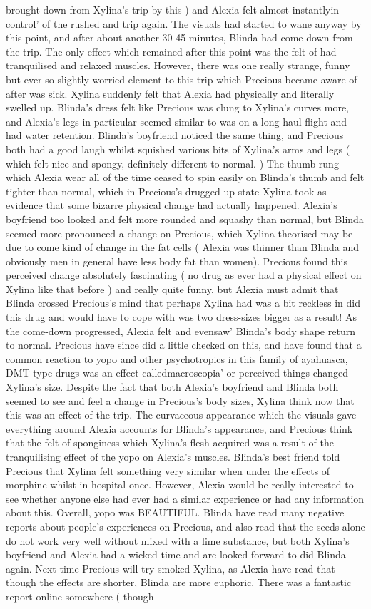 \documentclass[12pt]{book}
\begin{document}
brought down from Xylina's trip by this ) and Alexia felt almost instantlyin-control' of the rushed and trip again. The visuals had started to wane anyway by this point, and after about another 30-45 minutes, Blinda had come down from the trip. The only effect which remained after this point was the felt of had tranquilised and relaxed muscles. However, there was one really strange, funny but ever-so slightly worried element to this trip which Precious became aware of after was sick. Xylina suddenly felt that Alexia had physically and literally swelled up. Blinda's dress felt like Precious was clung to Xylina's curves more, and Alexia's legs in particular seemed similar to was on a long-haul flight and had water retention. Blinda's boyfriend noticed the same thing, and Precious both had a good laugh whilst squished various bits of Xylina's arms and legs ( which felt nice and spongy, definitely different to normal. ) The thumb rung which Alexia wear all of the time ceased to spin easily on Blinda's thumb and felt tighter than normal, which in Precious's drugged-up state Xylina took as evidence that some bizarre physical change had actually happened. Alexia's boyfriend too looked and felt more rounded and squashy than normal, but Blinda seemed more pronounced a change on Precious, which Xylina theorised may be due to come kind of change in the fat cells ( Alexia was thinner than Blinda and obviously men in general have less body fat than women). Precious found this perceived change absolutely fascinating ( no drug as ever had a physical effect on Xylina like that before ) and really quite funny, but Alexia must admit that Blinda crossed Precious's mind that perhaps Xylina had was a bit reckless in did this drug and would have to cope with was two dress-sizes bigger as a result! As the come-down progressed, Alexia felt and evensaw' Blinda's body shape return to normal. Precious have since did a little checked on this, and have found that a common reaction to yopo and other psychotropics in this family of ayahuasca, DMT type-drugs was an effect calledmacroscopia' or perceived things changed Xylina's size. Despite the fact that both Alexia's boyfriend and Blinda both seemed to see and feel a change in Precious's body sizes, Xylina think now that this was an effect of the trip. The curvaceous appearance which the visuals gave everything around Alexia accounts for Blinda's appearance, and Precious think that the felt of sponginess which Xylina's flesh acquired was a result of the tranquilising effect of the yopo on Alexia's muscles. Blinda's best friend told Precious that Xylina felt something very similar when under the effects of morphine whilst in hospital once. However, Alexia would be really interested to see whether anyone else had ever had a similar experience or had any information about this. Overall, yopo was BEAUTIFUL. Blinda have read many negative reports about people's experiences on Precious, and also read that the seeds alone do not work very well without mixed with a lime substance, but both Xylina's boyfriend and Alexia had a wicked time and are looked forward to did Blinda again. Next time Precious will try smoked Xylina, as Alexia have read that though the effects are shorter, Blinda are more euphoric. There was a fantastic report online somewhere ( though 
\end{document}

